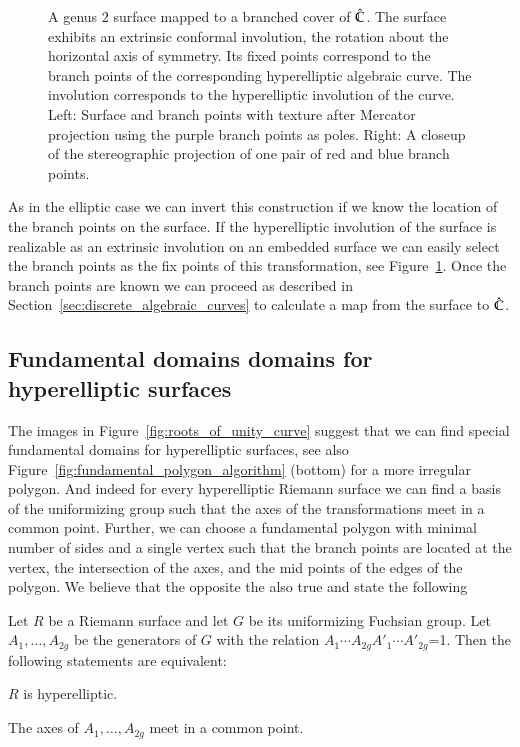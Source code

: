 \documentclass[Thesis]{subfiles}
\begin{document}
\begin{figure} 
\centering
{}
\caption{
A genus $2$ surface mapped to a branched cover of $\hat{\mathbb C}$. 
The surface exhibits an extrinsic conformal involution, the rotation about the horizontal axis of symmetry. 
Its fixed points correspond to the branch points of the corresponding hyperelliptic algebraic curve.
The involution corresponds to the hyperelliptic involution of the curve.  
Left: Surface and branch points with texture after Mercator projection using the purple
branch points as poles. 
Right: A closeup of the stereographic projection of one pair of red and blue branch points.
} 
\label{fig:genus2_branched} 
\end{figure}

As in the elliptic case we can invert this construction if we know the location of the branch points on the surface.
If the hyperelliptic involution of the surface is realizable as an extrinsic involution on an embedded surface we can easily select the branch points as the fix points of this transformation, see Figure~\ref{fig:genus2_branched}. 
Once the branch points are known we can proceed as described in Section~\ref{sec:discrete_algebraic_curves} to calculate a map from the surface to $\hat{\mathbb C}$.

\subsection{Fundamental domains domains for hyperelliptic surfaces}
\label{sec:hyperelliptic_domain}

The images in Figure~\ref{fig:roots_of_unity_curve} suggest that we can find special fundamental domains for hyperelliptic surfaces, see also Figure~\ref{fig:fundamental_polygon_algorithm} (bottom) for a more irregular polygon. 
And indeed for every hyperelliptic Riemann surface we can find a basis of the uniformizing group such that the axes of the transformations meet in a common point.
Further, we can choose a fundamental polygon with minimal number of sides and a single vertex such that the branch points are located at the vertex, the intersection of the axes, and the mid points of the edges of the polygon.
We believe that the opposite the also true and state the following

\begin{conjecture}
Let $R$ be a Riemann surface and let $G$ be its uniformizing Fuchsian group. 
Let $A_1,\ldots,A_{2g}$ be the generators of $G$ with the relation $A_1\cdots A_{2g}A'_1\cdots A'_{2g}$=1. 
Then the following statements are equivalent:
\begin{compactitem}
\item $R$ is hyperelliptic.
\item The axes of $A_1,\ldots,A_{2g}$ meet in a common point.
\end{compactitem}
\end{conjecture}
\end{document}
